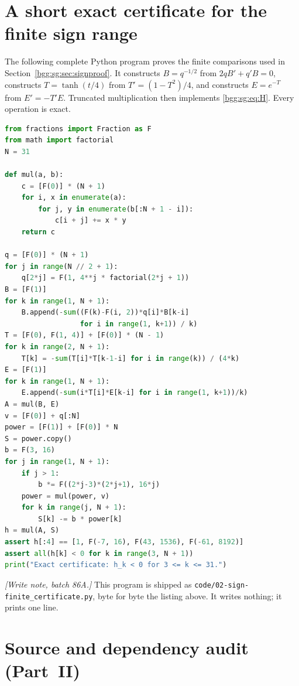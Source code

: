 \documentclass[11pt,a4paper]{article}
\numberwithin{equation}{section}
\theoremstyle{definition}
\theoremstyle{remark}
\theoremstyle{definition}
\begin{document}
\setcounter{section}{2}
\renewcommand{\thesection}{\Alph{section}}
\renewcommand{\theHsection}{sg.app.\Alph{section}}
\makeatletter\gdef\Hy@chapapp{\Hy@appendixstring}\makeatother

\section{A short exact certificate for the finite sign range}
\label{bgg:sg:app:certificate}

The following complete Python program proves the finite comparisons
used in Section~\ref{bgg:sg:sec:signproof}.  It constructs
\(B=q^{-1/2}\) from \(2qB'+q'B=0\), constructs
\(T=\tanh(t/4)\) from \(T'=(1-T^2)/4\), and constructs
\(E=e^{-T}\) from \(E'=-T'E\).
Truncated multiplication then implements \eqref{bgg:sg:eq:H}.
Every operation is exact.

\begin{lstlisting}[language=Python]
from fractions import Fraction as F
from math import factorial
N = 31

def mul(a, b):
    c = [F(0)] * (N + 1)
    for i, x in enumerate(a):
        for j, y in enumerate(b[:N + 1 - i]):
            c[i + j] += x * y
    return c

q = [F(0)] * (N + 1)
for j in range(N // 2 + 1):
    q[2*j] = F(1, 4**j * factorial(2*j + 1))
B = [F(1)]
for k in range(1, N + 1):
    B.append(-sum((F(k)-F(i, 2))*q[i]*B[k-i]
                  for i in range(1, k+1)) / k)
T = [F(0), F(1, 4)] + [F(0)] * (N - 1)
for k in range(2, N + 1):
    T[k] = -sum(T[i]*T[k-1-i] for i in range(k)) / (4*k)
E = [F(1)]
for k in range(1, N + 1):
    E.append(-sum(i*T[i]*E[k-i] for i in range(1, k+1))/k)
A = mul(B, E)
v = [F(0)] + q[:N]
power = [F(1)] + [F(0)] * N
S = power.copy()
b = F(3, 16)
for j in range(1, N + 1):
    if j > 1:
        b *= F((2*j-3)*(2*j+1), 16*j)
    power = mul(power, v)
    for k in range(j, N + 1):
        S[k] -= b * power[k]
h = mul(A, S)
assert h[:4] == [1, F(-7, 16), F(43, 1536), F(-61, 8192)]
assert all(h[k] < 0 for k in range(3, N + 1))
print("Exact certificate: h_k < 0 for 3 <= k <= 31.")
\end{lstlisting}

\emph{[Write note, batch 86A.]} This program is shipped as
\texttt{code/02-sign-finite\_certificate.py}, byte for byte the listing
above. It writes nothing; it prints one line.

\section{Source and dependency audit (Part~II)}\label{bgg:sg:app:sources}
\end{document}
